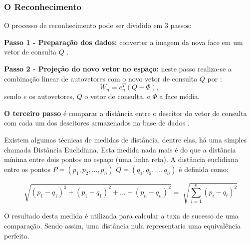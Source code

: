\subsubsection{O Reconhecimento}\label{subsec:reconhecimento}

O processo de reconhecimento pode ser dividido em 3 passos:

\textbf{Passo 1 - Preparação dos dados:} converter a imagem da nova face em um vetor de consulta $Q$ \cite{geysilva}.


\textbf{Passo 2 - Projeção do novo vetor no espaço:} neste passo realiza-se a combinação linear de autovetores com o novo vetor de consulta $Q$ por \cite{geysilva}:
\begin{equation}
	W_n = {e^T_n} (Q - \Phi),
\end{equation}
sendo $e$ os autovetores, $Q$ o vetor de consulta, e $\Phi$ a face média.

\textbf{O terceiro passo} é comparar a distância entre o descitor do vetor de consulta com cada um dos descitores armazenados na base de dados \cite{geysilva}. 


Existem algumas técnicas de medidas de distância, dentre elas, há uma simples chamada Distância Euclidiana. Esta medida nada mais é do que a distância mínima entre dois pontos no espaço (uma linha reta). A distância euclidiana entre os pontos $P = (p_1, p_2, ..., p_n)$ $Q = (q_1, q_2, ..., q_n)$ é definida como:

\begin{equation}
	\sqrt[]{(p_1 - q_1)^2 + (p_1 - q_1)^2 + ... + (p_n - q_n)^2} = \sqrt[]{ \sum_{i=1}^{n} (p_i - q_i)^2 }
\end{equation}

O resultado desta medida é utilizada para calcular a taxa de sucesso de uma comparação. Sendo assim, uma distância nula representaria uma equivalência perfeita.


